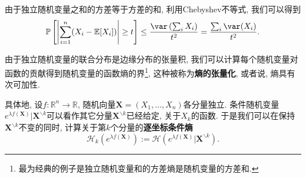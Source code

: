 由于独立随机变量之和的方差等于方差的和, 利用Chebyshev不等式, 我们可以得到
\begin{equation*}
	\mathbb{P} \left[ \left|\sum_{i=1}^n (X_i - \mathbb{E}[X_i]) \right| \geq t \right]
	\leq \frac{\var\left(\sum_i  X_i\right)}{t^2}
	= \frac{\sum_i \var(X_i)}{t^2}. 
\end{equation*}

\sp 

由于独立随机变量的联合分布是边缘分布的张量积, 我们可以计算每个随机变量对函数的贡献得到随机变量的函数熵的界\footnote{最为经典的例子是独立随机变量和的方差熵是随机变量的方差和.}, 这种被称为\textbf{熵的张量化}, 或者说, 熵具有次可加性.


具体地, 设$f \colon \mathbb{R}^n \to \mathbb{R}$, 随机向量$\bm{X} = (X_1, \dots, X_n)$各分量独立. 
条件随机变量$e^{\lambda f(\bm{X})} | \bm{X}^{\backslash k}$可以看作其它分量$\bm{X}^{\backslash k}$已经给定, 关于$X_k$的函数. 
于是我们可以在保持$\bm{X}^{\backslash k}$不变的同时, 计算关于第$k$个分量的\textbf{逐坐标条件熵}
\begin{equation*}
	\mathcal{H}_k ( e^{\lambda f(\bm{X})} )
	:= \mathcal{H} ( e^{\lambda f(\bm{X})} | \bm{X}^{\backslash k} ). 
\end{equation*}


